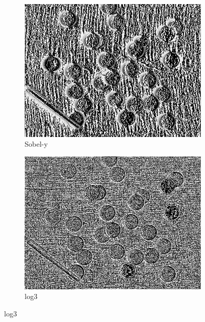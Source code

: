 \documentclass[14pt]{article}
\begin{document}
\begin{figure}[hbt!]
		\begin{subfigure}[b]{0.23\linewidth}
			\includegraphics[width=\linewidth]{k7.png}
			\caption{Sobel-y}
		\end{subfigure}
		\begin{subfigure}[b]{0.23\linewidth}
			\includegraphics[width=\linewidth]{k8.png}
			\caption{log3}
		\end{subfigure}
	\end{figure}
\end{document}
